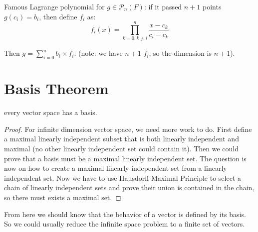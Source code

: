 \begin{example}
   Famous Lagrange polynomial for $g \in \mathcal{P}_n (F)$: if it passed $n+1$ points $g(c_i) = b_i$, then define $f_i$ as:
\begin{equation}
    f_i(x) = \prod_{k=0,k \neq i}^{n} \frac{x - c_k}{c_i - c_k}
\end{equation}

Then $\displaystyle g = \sum_{i=0}^{n} b_i \times f_i $. (note: we have $n+1$ $f_i$, so the dimension is $n+1$). 
\end{example}



\section{Basis Theorem}
\begin{theorem}
    every vector space has a basis.
\end{theorem}
\begin{proof}
    For infinite dimension vector space, we need more work to do. First define a maximal linearly independent subset that is both linearly independent and maximal (no other linearly independent set could contain it). Then we could prove that a basis must be a maximal linearly independent set. The question is now on how to create a maximal linearly independent set from a linearly independent set. Now we have to use Hausdorff Maximal Principle to select a chain of linearly independent sets and prove their union is contained in the chain, so there must exists a maximal set.
\end{proof}


From here we should know that the behavior of a vector is defined by its basis. So we could usually reduce the infinite space problem to a finite set of vectors.

















